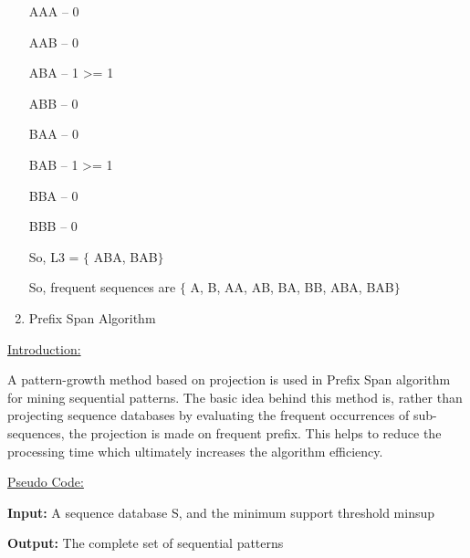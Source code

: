 \documentclass[12pt]{article}
\renewcommand{\_}{\kern-1.5pt\textunderscore\kern-1.5pt}
\begin{document}
\begin{enumerate}
AAA – 0\par

AAB – 0\par

ABA – 1 >= 1\par

ABB – 0\par

BAA – 0\par

BAB – 1 >= 1\par

BBA – 0\par

BBB – 0\par

So, L3 = $ \{ $ ABA, BAB$ \} $ \par

So, frequent sequences are $ \{ $ A, B, AA, AB, BA, BB, ABA, BAB$ \} $ \par


\vspace{\baselineskip}
	\item {\fontsize{20pt}{24.0pt}\selectfont Prefix Span Algorithm\par}
\end{enumerate}\par

{\fontsize{14pt}{16.8pt}\selectfont \uline{Introduction:}\par}\par

\setlength{\parskip}{0.0pt}
A pattern-growth method based on projection is used in Prefix Span algorithm for mining sequential patterns. The basic idea behind this method is, rather than projecting sequence databases by evaluating the frequent occurrences of sub-sequences, the projection is made on frequent prefix. This helps to reduce the processing time which ultimately increases the algorithm efficiency.\par


\vspace{\baselineskip}
\setlength{\parskip}{8.04pt}
{\fontsize{14pt}{16.8pt}\selectfont \uline{Pseudo Code:}\par}\par

\textbf{Input:} A sequence database S, and the minimum support threshold min\_sup \par

\textbf{Output:} The complete set of sequential patterns \par
\end{document}
